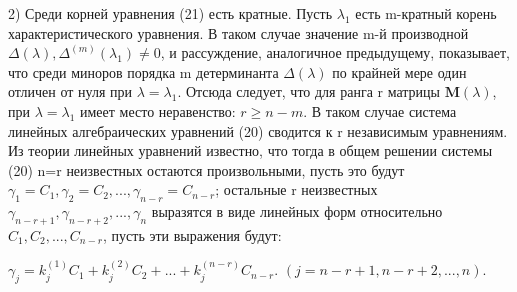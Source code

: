 \documentclass[11pt,a5paper,top=10mm]{book}
\begin{document}
	2) Среди корней уравнения (21) есть кратные. Пусть $\lambda_1$ есть m-кратный корень характеристического уравнения. В таком случае значение m-й производной $\Delta (\lambda), \Delta^{(m)} (\lambda_1) \neq 0$, и рассуждение, аналогичное предыдущему, показывает, что среди миноров порядка m детерминанта $\Delta (\lambda)$ по крайней мере один отличен от нуля при $\lambda=\lambda_1$. Отсюда следует, что для ранга r матрицы $\textbf{M} (\lambda)$, при $\lambda=\lambda_1$ имеет место неравенство: $r \ge n-m$. В таком случае система линейных алгебраических уравнений (20) сводится к r независимым уравнениям. Из теории линейных уравнений известно, что тогда в общем решении системы (20) n=r неизвестных остаются произвольными, пусть это будут $\gamma_1 = C_1, \gamma_2 = C_2,...,\gamma_{n-r} = C_{n-r}$; остальные r неизвестных $\gamma_{n-r+1}, \gamma_{n-r+2},...,\gamma_{n}$ выразятся в виде линейных форм относительно $C_1, C_2,...,C_{n-r}$, пусть эти выражения будут:
	\par
	{\centering
		\hspace{15mm}
	$\gamma_j=k_j^{(1)}C_1+k_j^{(2)} C_2+...+k_j^{(n-r)} C_{n-r}.$	
	\newline
	$(j=n-r+1, n-r+2,...,n).$
\par} 
\end{document}
